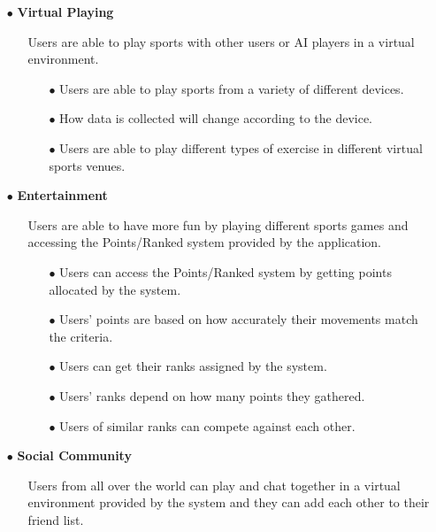 \documentclass[a4paper]{article}
\begin{document}
\begin{itemize}
\begin{itemize}
		\end{itemize}
		\item[$\bullet$] {\large\textbf{Virtual Playing}}
		\begin{itemize}
			\item[] Users are able to play sports with other users or AI players in a virtual environment.
			\begin{itemize}
				\item[$\bullet$] Users are able to play sports from a variety of different devices.
				\item[$\bullet$] How data is collected will change according to the device.
				\item[$\bullet$] Users are able to play different types of exercise in different virtual sports venues.
			\end{itemize}
		\end{itemize}
		\item[$\bullet$] {\large\textbf{Entertainment}}
		\begin{itemize}
			\item[] Users are able to have more fun by playing different sports games and accessing the Points/Ranked system provided by the application.
			\begin{itemize}
				\item[$\bullet$] Users can access the Points/Ranked system by getting points allocated by the system.
				\item[$\bullet$] Users' points are based on how accurately their movements match the criteria.
				\item[$\bullet$] Users can get their ranks assigned by the system.
				\item[$\bullet$] Users' ranks depend on how many points they gathered. 	
				\item[$\bullet$] Users of similar ranks can compete against each other.			
			\end{itemize}
		\end{itemize}
		\item[$\bullet$] {\large\textbf{Social Community}}
		\begin{itemize}
			\item[] Users from all over the world can play and chat together in a virtual environment provided by the system and they can add each other to their friend list.

\end{itemize}
\end{itemize}
\end{document}
